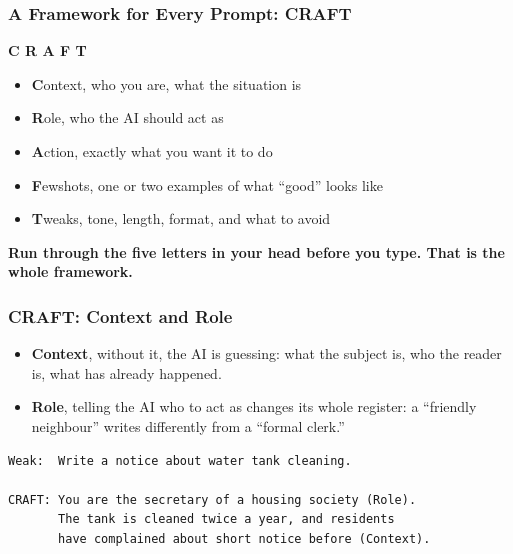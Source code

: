 \begin{frame}[fragile]\frametitle{A Framework for Every Prompt: CRAFT}

\begin{center}
\Large \textbf{C R A F T}
\end{center}

\medskip
\begin{itemize}
    \item \textbf{C}ontext, who you are, what the situation is
    \item \textbf{R}ole, who the AI should act as
    \item \textbf{A}ction, exactly what you want it to do
    \item \textbf{F}ewshots, one or two examples of what ``good'' looks like
    \item \textbf{T}weaks, tone, length, format, and what to avoid
\end{itemize}

\medskip
\begin{center}
\textbf{Run through the five letters in your head before you type. That is the whole framework.}
\end{center}

\end{frame}

\begin{frame}[fragile]\frametitle{CRAFT: Context and Role}

\begin{itemize}
    \item \textbf{Context}, without it, the AI is guessing: what the subject is, who the reader is, what has already happened.
    \item \textbf{Role}, telling the AI who to act as changes its whole register: a ``friendly neighbour'' writes differently from a ``formal clerk.''
\end{itemize}

\begin{lstlisting}[language=HTML]
Weak:  Write a notice about water tank cleaning.

CRAFT: You are the secretary of a housing society (Role).
       The tank is cleaned twice a year, and residents
       have complained about short notice before (Context).
\end{lstlisting}

\end{frame}

